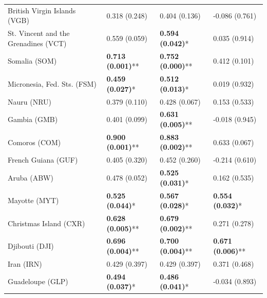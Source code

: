 \begin{longtable}{p{5cm}p{3cm}p{3cm}p{5cm}}
British Virgin Islands (VGB) & \textcolor{atlOrange600}{0.318 (0.248)} & \textcolor{atlOrange600}{0.404 (0.136)} & \textcolor{atlOrange600}{-0.086 (0.761)} \\
St. Vincent and the Grenadines (VCT) & \textcolor{atlOrange600}{0.559 (0.059)} & \textcolor{atlLime600}{\textbf{0.594 (0.042)}*} & \textcolor{atlOrange600}{0.035 (0.914)} \\
Somalia (SOM) & \textcolor{atlLime600}{\textbf{0.713 (0.001)}**} & \textcolor{atlLime600}{\textbf{0.752 (0.000)}**} & \textcolor{atlOrange600}{0.412 (0.101)} \\
Micronesia, Fed. Sts. (FSM) & \textcolor{atlLime600}{\textbf{0.459 (0.027)}*} & \textcolor{atlLime600}{\textbf{0.512 (0.013)}*} & \textcolor{atlOrange600}{0.019 (0.932)} \\
Nauru (NRU) & \textcolor{atlOrange600}{0.379 (0.110)} & \textcolor{atlOrange600}{0.428 (0.067)} & \textcolor{atlOrange600}{0.153 (0.533)} \\
Gambia (GMB) & \textcolor{atlOrange600}{0.401 (0.099)} & \textcolor{atlLime600}{\textbf{0.631 (0.005)}**} & \textcolor{atlOrange600}{-0.018 (0.945)} \\
Comoros (COM) & \textcolor{atlLime600}{\textbf{0.900 (0.001)}**} & \textcolor{atlLime600}{\textbf{0.883 (0.002)}**} & \textcolor{atlOrange600}{0.633 (0.067)} \\
French Guiana (GUF) & \textcolor{atlOrange600}{0.405 (0.320)} & \textcolor{atlOrange600}{0.452 (0.260)} & \textcolor{atlOrange600}{-0.214 (0.610)} \\
Aruba (ABW) & \textcolor{atlOrange600}{0.478 (0.052)} & \textcolor{atlLime600}{\textbf{0.525 (0.031)}*} & \textcolor{atlOrange600}{0.162 (0.535)} \\
Mayotte (MYT) & \textcolor{atlLime600}{\textbf{0.525 (0.044)}*} & \textcolor{atlLime600}{\textbf{0.567 (0.028)}*} & \textcolor{atlLime600}{\textbf{0.554 (0.032)}*} \\
Christmas Island (CXR) & \textcolor{atlLime600}{\textbf{0.628 (0.005)}**} & \textcolor{atlLime600}{\textbf{0.679 (0.002)}**} & \textcolor{atlOrange600}{0.271 (0.278)} \\
Djibouti (DJI) & \textcolor{atlLime600}{\textbf{0.696 (0.004)}**} & \textcolor{atlLime600}{\textbf{0.700 (0.004)}**} & \textcolor{atlLime600}{\textbf{0.671 (0.006)}**} \\
Iran (IRN) & \textcolor{atlOrange600}{0.429 (0.397)} & \textcolor{atlOrange600}{0.429 (0.397)} & \textcolor{atlOrange600}{0.371 (0.468)} \\
Guadeloupe (GLP) & \textcolor{atlLime600}{\textbf{0.494 (0.037)}*} & \textcolor{atlLime600}{\textbf{0.486 (0.041)}*} & \textcolor{atlOrange600}{-0.034 (0.893)} \\

\end{longtable}
